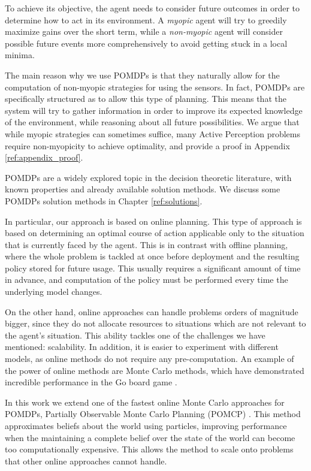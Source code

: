 To achieve its objective, the agent needs to consider future outcomes in order to determine how to
act in its environment. A \textit{myopic} agent will try to greedily maximize gains over the short
term, while a \textit{non-myopic} agent will consider possible future events more comprehensively to
 avoid getting stuck in a local minima.

The main reason why we use POMDPs is that they naturally allow for the computation of non-myopic
strategies for using the sensors. In fact, POMDPs are specifically structured as to allow this type
of planning. This means that the system will try to gather information in order to improve its
expected knowledge of the environment, while reasoning about all future possibilities. We argue that
while myopic strategies can sometimes suffice, many Active Perception problems require non-myopicity
to achieve optimality, and provide a proof in Appendix \ref{ref:appendix_proof}.

POMDPs are a widely explored topic in the decision theoretic literature, with known properties and
already available solution methods. We discuss some POMDPs solution methods in Chapter
\ref{ref:solutions}.

In particular, our approach is based on online planning. This type of approach is based on
determining an optimal course of action applicable only to the situation that is currently faced by
the agent. This is in contrast with offline planning, where the whole problem is tackled at once
before deployment and the resulting policy stored for future usage. This usually requires a
significant amount of time in advance, and computation of the policy must be performed every time
the underlying model changes.

On the other hand, online approaches can handle problems orders of magnitude bigger, since they do
not allocate resources to situations which are not relevant to the agent's situation. This ability
tackles one of the challenges we have mentioned: scalability. In addition, it is easier to
experiment with different models, as online methods do not require any pre-computation. An example
of the power of online methods are Monte Carlo methods, which have demonstrated incredible
performance in the Go board game \cite{cit:mcts}.

In this work we extend one of the fastest online Monte Carlo approaches for POMDPs, Partially
Observable Monte Carlo Planning (POMCP) \cite{cit:pomcp}. This method approximates beliefs about the
world using particles, improving performance when the maintaining a complete belief over the state
of the world can become too computationally expensive. This allows the method to scale onto problems
that other online approaches cannot handle.

